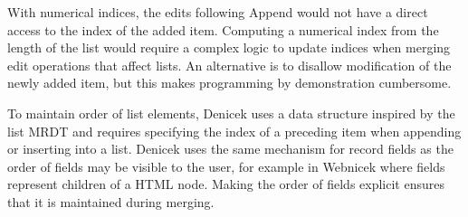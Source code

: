 \documentclass[sigconf,anonymous,screen]{acmart}
\newcommand{\ident}[1]{{\sffamily #1}}
\newcommand{\note}[1]{\textcolor{red}{#1}}
\begin{document}
With numerical indices, the edits following \ident{Append} would not have a direct access to the
index of the added item. Computing a numerical index from the length of the list would require
a complex logic to update indices when merging edit operations that affect lists. An alternative
is to disallow modification of the newly added item, but this makes programming by demonstration
cumbersome.

%
%

To maintain order of list elements, Denicek uses a data structure inspired by the list MRDT
\cite{kaki-2019-mrdts} and requires specifying the index of a preceding item when appending
or inserting into a list. Denicek uses the same mechanism for record fields as the order of fields
may be visible to the user, for example in Webnicek where fields represent children of a HTML node.
Making the order of fields explicit ensures that it is maintained during merging.
\end{document}
